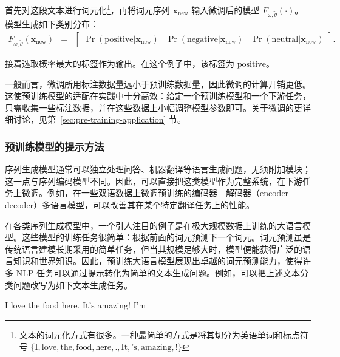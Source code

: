\noindent 首先对这段文本进行词元化\footnote{文本的词元化方式有很多。一种最简单的方式是将其切分为英语单词和标点符号 $\{\textrm{I}, \textrm{love}, \textrm{the}, \textrm{food}, \textrm{here}, \textrm{.}, \textrm{It}, \textrm{'s}, \textrm{amazing}, \textrm{!}\}$}，再将词元序列 $\mathbf{x}_{\mathrm{new}}$ 输入微调后的模型 $F_{\tilde{\omega},\tilde{\theta}}(\cdot)$。模型生成如下类别分布：
\begin{eqnarray}
F_{\tilde{\omega},\tilde{\theta}}(\mathbf{x}_{\mathrm{new}}) & = & \begin{bmatrix} \Pr(\mathrm{positive}|\mathbf{x}_{\mathrm{new}}) & \Pr(\mathrm{negative}|\mathbf{x}_{\mathrm{new}}) & \Pr(\mathrm{neutral}|\mathbf{x}_{\mathrm{new}})\end{bmatrix}.
\end{eqnarray}

\noindent 接着选取概率最大的标签作为输出。在这个例子中，该标签为 $\mathrm{positive}$。

一般而言，微调所用标注数据量远小于预训练数据量，因此微调的计算开销更低。这使预训练模型的适配在实践中十分高效：给定一个预训练模型和一个下游任务，只需收集一些标注数据，并在这些数据上小幅调整模型参数即可。关于微调的更详细讨论，见第~\ref{sec:pre-training-application} 节。

\subsubsection{预训练模型的提示方法}

\noindent 序列生成模型通常可以独立处理问答、机器翻译等语言生成问题，无须附加模块；这一点与序列编码模型不同。因此，可以直接把这类模型作为完整系统，在下游任务上微调。例如，在一些双语数据上微调预训练的编码器—解码器（encoder-decoder）多语言模型，可以改善其在某个特定翻译任务上的性能。

在各类序列生成模型中，一个引人注目的例子是在极大规模数据上训练的大语言模型。这些模型的训练任务很简单：根据前面的词元预测下一个词元。词元预测虽是传统语言建模长期采用的简单任务，但当其规模足够大时，模型便能获得广泛的语言知识和世界知识。因此，预训练大语言模型展现出卓越的词元预测能力，使得许多 NLP 任务可以通过提示转化为简单的文本生成问题。例如，可以把上述文本分类问题改写为如下文本生成任务。

\begin{center}
\vspace{0.5em}
I love the food here. It's amazing! I'm \underline{\hspace{3em}}
\vspace{0.5em}
\end{center}

